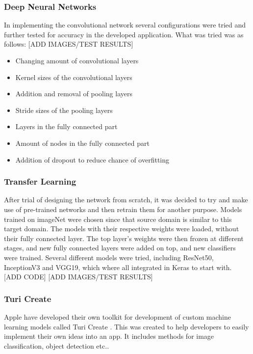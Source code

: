 \subsubsection{Deep Neural Networks}
In implementing the convolutional network several configurations were tried and further tested for accuracy in the developed application. What was tried was as follows:
[ADD IMAGES/TEST RESULTS]

\begin{itemize}
\item Changing amount of convolutional layers
\item Kernel sizes of the convolutional layers
\item Addition and removal of pooling layers
\item Stride sizes of the pooling layers
\item Layers in the fully connected part
\item Amount of nodes in the fully connected part
\item Addition of dropout to reduce chance of overfitting 
\end{itemize}

\subsubsection{Transfer Learning}
After trial of designing the network from scratch, it was decided to try and make use of pre-trained networks and then retrain them for another purpose. Models trained on imageNet \cite{imageNet} were chosen since that source domain is similar to this target domain. The models with their respective weights were loaded, without their fully connected layer. The top layer's weights were then frozen at different stages, and new fully connected layers were added on top, and new classifiers were trained. 
Several different models were tried, including ResNet50, InceptionV3 and VGG19, which where all integrated in Keras to start with.
[ADD CODE]
[ADD IMAGES/TEST RESULTS]

\subsubsection{Turi Create}
Apple have developed their own toolkit for development of custom machine learning models called Turi Create \cite{turiCreate}. This was created to help developers to easily implement their own ideas into an app. It includes methods for image classification, object detection etc.. 

